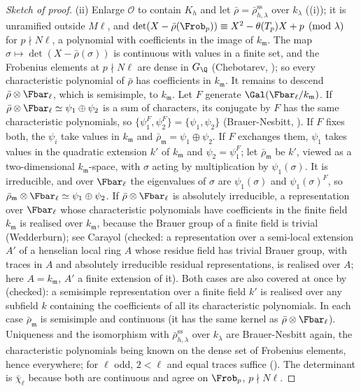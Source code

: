 \begin{proof}[Sketch of proof]
(ii) Enlarge $\mathcal{O}$ to contain $K_h$ and let $\bar\rho=\bar\rho_{h,\lambda}^{\mathrm{ss}}$ over $k_\lambda$ ((i)); it is unramified outside $M\ell$, and
$\det(X-\bar\rho(\Frob_p))\equiv X^2-\theta(T_p)X+p\pmod\lambda$ for $p\nmid N\ell$, a polynomial with coefficients in the image of $k_{\mathfrak m}$. The map $\sigma\mapsto\det(X-\bar\rho(\sigma))$ is
continuous with values in a finite set, and the Frobenius elements at $p\nmid N\ell$ are dense in $G_\Q$ (Chebotarev, ); so every characteristic polynomial
of $\bar\rho$ has coefficients in $k_{\mathfrak m}$. It remains to descend $\bar\rho\otimes\Fbar_\ell$, which is semisimple, to $k_{\mathfrak m}$. Let $F$ generate $\Gal(\Fbar_\ell/k_{\mathfrak m})$.
If $\bar\rho\otimes\Fbar_\ell\simeq\psi_1\oplus\psi_2$ is a sum of characters, its conjugate by $F$ has the same characteristic polynomials, so $\{\psi_1^F,\psi_2^F\}=\{\psi_1,\psi_2\}$
(Brauer-Nesbitt, ). If $F$ fixes both, the $\psi_i$ take values in $k_{\mathfrak m}$ and $\bar\rho_{\mathfrak m}=\psi_1\oplus\psi_2$. If $F$ exchanges them, $\psi_1$ takes values in the
quadratic extension $k'$ of $k_{\mathfrak m}$ and $\psi_2=\psi_1^F$; let $\bar\rho_{\mathfrak m}$ be $k'$, viewed as a two-dimensional $k_{\mathfrak m}$-space, with $\sigma$ acting by multiplication by $\psi_1(\sigma)$. It is
irreducible, and over $\Fbar_\ell$ the eigenvalues of $\sigma$ are $\psi_1(\sigma)$ and $\psi_1(\sigma)^F$, so $\bar\rho_{\mathfrak m}\otimes\Fbar_\ell\simeq\psi_1\oplus\psi_2$. If $\bar\rho\otimes\Fbar_\ell$ is absolutely
irreducible, a representation over $\Fbar_\ell$ whose characteristic polynomials have coefficients in the finite field $k_{\mathfrak m}$ is realised over $k_{\mathfrak m}$, because the Brauer
group of a finite field is trivial (Wedderburn); see Carayol \cite[Th\'eor\`eme 2, Section 1.2]{Carayol94} (checked: a representation over a semi-local extension $A'$ of a
henselian local ring $A$ whose residue field has trivial Brauer group, with traces in $A$ and absolutely irreducible residual representations, is realised over $A$; here
$A=k_{\mathfrak m}$, $A'$ a finite extension of it). Both cases are also covered at once by \cite[Lemme 6.13]{DeligneSerre74} (checked): a semisimple representation over a finite field
$k'$ is realised over any subfield $k$ containing the coefficients of all its characteristic polynomials. In each case $\bar\rho_{\mathfrak m}$ is semisimple and continuous (it has the same kernel as $\bar\rho\otimes\Fbar_\ell$). Uniqueness and the isomorphism with $\bar\rho_{h,\lambda}^{\mathrm{ss}}$
over $k_\lambda$ are Brauer-Nesbitt again, the characteristic polynomials being known on the dense set of Frobenius elements, hence everywhere; for $\ell$ odd,
$2<\ell$ and equal traces suffice (). The determinant is $\bar\chi_\ell$ because both are continuous and agree on $\Frob_p$, $p\nmid N\ell$.


\end{proof}
